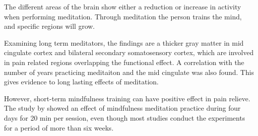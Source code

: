 The different areas of the brain show either a reduction or increase in activity when performing meditation. Through meditation the person trains the mind, and specific regions will grow. \cite{Zeidan2012}

Examining long term meditators, the findings are a thicker gray matter in mid cingulate cortex and bilateral secondary somatosensory cortex, which are involved in pain related regions overlapping the functional effect. A correlation with the number of years practicing meditaiton and the mid cingulate was also found. This gives evidence to long lasting effects of meditation. \cite{Zeidan2012}

However, short-term mindfulness training can have positive effect in pain relieve. The study by \cite{Zeidan2012} showed an effect of mindfulness meditation practice during four days for 20 min per session, even though most studies conduct the experiments for a period of more than six weeks. \cite{Zeidan2012}